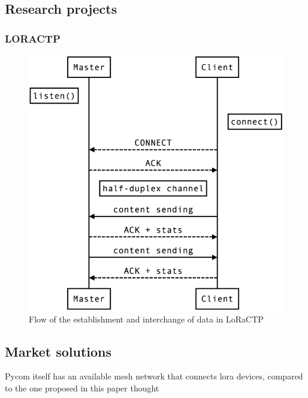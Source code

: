 		
		\subsection{Research projects}
		
			
			
			
			\subsubsection{LORACTP}
			
			
				\begin{figure}[H]
					\centering
					\includegraphics[width=.5\textwidth]{resources/img/loractp_flow}
					\caption{Flow of the establishment and interchange of data in LoRaCTP}
				\end{figure}
		
		\subsection{Market solutions}
		
		
		
			Pycom itself has an available mesh network that connects lora devices, compared to the one proposed in this paper thought
			
